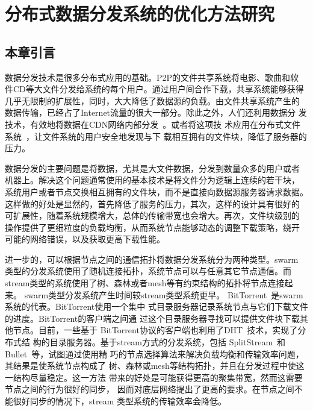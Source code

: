 \chapter{分布式数据分发系统的优化方法研究}
\label{chap:bt}

\section{本章引言}


数据分发技术是很多分布式应用的基础。P2P的文件共享系统将电影、歌曲和软
件CD等大文件分发给系统的每个用户。通过用户间合作下载，共享系统能够获得
几乎无限制的扩展性，同时，大大降低了数据源的负载。由文件共享系统产生的
数据传输，已经占了Internet流量的很大一部分。除此之外，人们还利用数据分
发技术，有效地将数据在CDN网络内部分发~\cite{fastreplica}。或者将这项技
术应用在分布式文件系统~\cite{sharkfs}，让文件系统的用户安全地发现与下
载相互拥有的文件块，降低了服务器的压力。

数据分发的主要问题是将数据，尤其是大文件数据，分发到数量众多的用户或者
机器上。解决这个问题通常使用的基本技术是将文件分为逻辑上连续的若干块，
系统用户或者节点交换相互拥有的文件块，而不是直接向数据源服务器请求数据。
这样做的好处是显然的，首先降低了服务的压力，其次，这样的设计具有很好的
可扩展性，随着系统规模增大，总体的传输带宽也会增大。再次，文件块级别的
操作提供了更细粒度的负载均衡，从而系统节点能够动态的调整下载策略，绕开
可能的网络错误，以及获取更高下载性能。

进一步的，可以根据节点之间的通信拓扑将数据分发系统分为两种类型。swarm
类型的分发系统使用了随机连接拓扑，系统节点可以与任意其它节点通信。而
stream类型的系统使用了树、森林或者mesh等有约束结构的拓扑将节点连接起来。
swarm类型分发系统产生时间较stream类型系统更早。
BitTorrent~\cite{bittorrent}是swarm系统的代表。BitTorrent使用一个集中
式目录服务器记录系统节点与它们下载文件的进度。BitTorrent的客户端之间通
过这个目录服务器寻找可以提供文件块下载其他节点。目前，一些基于
BitTorrent协议的客户端也利用了DHT~\cite{kademlia}技术，实现了分布式结
构的目录服务器。基于stream方式的分发系统，包括
SplitStream~\cite{splitstream}和Bullet~\cite{bullet}等，试图通过使用精
巧的节点选择算法来解决负载均衡和传输效率问题，其结果是使系统节点构成了
树、森林或mesh等结构拓扑，并且在分发过程中使这一结构尽量稳定。这一方法
带来的好处是可能获得更高的聚集带宽，然而这需要节点之间的行为很好的同步，
因而对底层网络提出了更高的要求。在节点之间不能很好同步的情况下，stream
类型系统的传输效率会降低。

